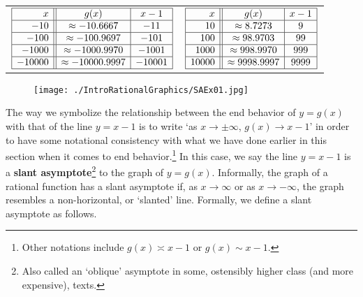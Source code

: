 \begin{table}
\begin{center}
  
\begin{tabular}{cc}

\small
$\begin{array}[t]{|r||c|c|}  \hline
  x & g(x) & x-1 \\ \hline
 -10 & \approx -10.6667 & -11 \\  \hline
 -100 & \approx -100.9697 & -101 \\  \hline 
 -1000 &  \approx -1000.9970&   -1001 \\ \hline 
  -10000 &  \approx -10000.9997 &  -10001 \\ \hline 
  \end{array} $ & 

\small
$\begin{array}[t]{|r||c|c|}  \hline
  x & g(x) & x-1 \\ \hline
 10 & \approx 8.7273 &    9 \\\hline
 100 & \approx 98.9703 &   99 \\ \hline 
 1000 &  \approx 998.9970 &  999 \\ \hline 
  10000 &  \approx 9998.9997 &   9999 \\ \hline 
  \end{array} $ \\

\end{tabular}

\caption{}
\label{tab:yeqgxvalues}
\end{center}
\end{table}
  
\begin{figure}
\begin{center}
   
\texttt{[image: ./IntroRationalGraphics/SAEx01.jpg]}

\caption{}
\label{fig:yeqgxeqxsquaredetc}
\end{center}
\end{figure}
 
The way we symbolize the relationship between the end behavior of $y=g(x)$ with that of the line $y=x-1$ is to write `as $x \rightarrow \pm \infty$, $g(x) \rightarrow x-1$' in order to have some notational consistency with what we have done earlier in this section when it comes to end behavior.\footnote{Other notations include $g(x) \asymp x-1$ or $g(x) \sim x-1$.}  In this case, we say the line $y=x-1$ is a    \textbf{slant asymptote}\footnote{Also called an `oblique' asymptote in some, ostensibly higher class (and more expensive), texts.}  to the graph of $y=g(x)$.  Informally, the graph of a rational function has a slant asymptote if, as $x \rightarrow \infty$ or as $x \rightarrow -\infty$, the graph resembles a non-horizontal, or `slanted' line.  Formally, we define a slant asymptote as follows.


